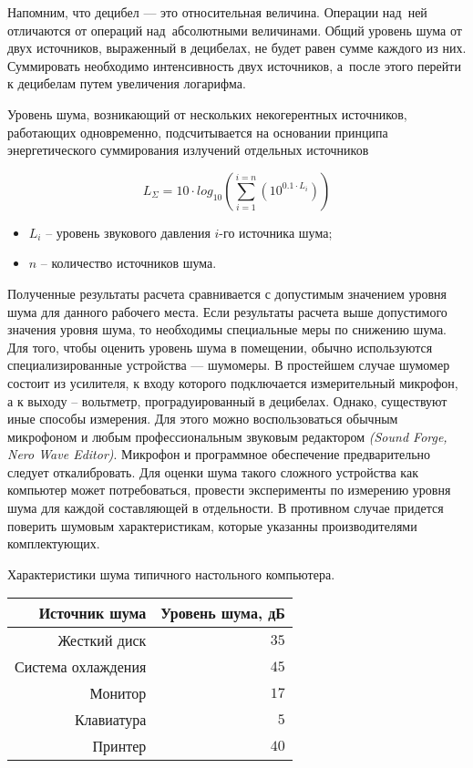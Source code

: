 Напомним, что децибел --- это относительная величина. 
Операции над~ней отличаются от операций над~абсолютными величинами. 
Общий уровень шума от двух источников, выраженный в децибелах, 
не будет равен сумме каждого из них. 
Суммировать необходимо интенсивность двух источников, 
а~после этого перейти к децибелам путем увеличения логарифма.

Уровень шума, возникающий от нескольких некогерентных источников, работающих
одновременно, подсчитывается на основании принципа энергетического
суммирования излучений отдельных источников

\[
	L_{\varSigma} = 10 \cdot log_{10} \left( \sum\limits_{i = 1}^{i = n}   \left(    10^{0.1 \cdot L_i}    \right)  \right)
\]

\begin{itemize}
	\item  $L_i$ – уровень звукового давления $i$-го источника шума;
	\item  $n$ – количество источников шума.
\end{itemize}

Полученные результаты расчета сравнивается с допустимым значением уровня
шума для данного рабочего места. Если результаты расчета выше допустимого
значения уровня шума, то необходимы специальные меры по снижению шума.
Для того, чтобы оценить уровень шума в помещении, обычно 
используются специализированные устройства --- шумомеры.
В простейшем случае шумомер состоит из усилителя, 
к входу которого подключается измерительный микрофон, 
а к выходу – вольтметр, проградуированный в децибелах.
Однако, существуют иные способы измерения. 
Для этого можно воспользоваться обычным микрофоном 
и любым профессиональным звуковым редактором \textit{(Sound Forge, Nero Wave Editor)}. 
Микрофон и программное обеспечение 
предварительно следует откалибровать.
Для оценки шума такого сложного устройства как компьютер может потребоваться,
провести эксперименты по измерению уровня шума для каждой составляющей в отдельности.
В противном случае придется поверить шумовым характеристикам, которые указанны производителями комплектующих.

\begin{dtable}{Характеристики шума типичного настольного компьютера.}
	\begin{tabular}{|r|r|}
		\hline  Источник шума   		& Уровень шума, дБ	 \\ 
		\hline  Жесткий диск 		 	&  $35$ \\ 
		\hline  Система охлаждения		&  $45$ \\ 
		\hline  Монитор	 				&  $17$ \\ 
		\hline  Клавиатура  		  	&  $5$  \\ 
		\hline  Принтер	 				&  $40$ \\ 
		\hline 
	\end{tabular} 
\end{dtable}

